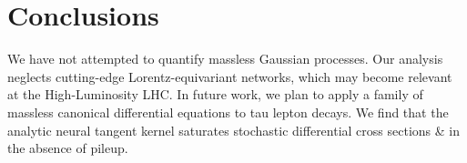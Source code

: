 \section{Conclusions}\label{sec:conclusions}

We have not attempted to quantify massless Gaussian processes. Our
analysis neglects cutting-edge Lorentz-equivariant networks, which may
become relevant at the High-Luminosity LHC. In future work, we plan to
apply a family of massless canonical differential equations to tau
lepton decays. We find that the analytic neural tangent kernel saturates
stochastic differential cross sections & in the absence of pileup.

